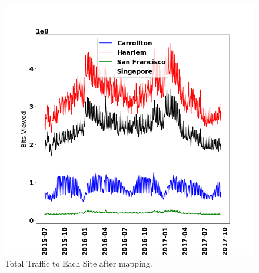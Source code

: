 \begin{figure}[h]
\centering
    \includegraphics[scale=0.5]{traffic_profile/images/ingress_hitrate_95_links.png}
    \caption[Total Traffic to Each Site after mapping]{Total Traffic to Each Site after mapping.}
\label{ingress_hitrate_95_links}
\end{figure}